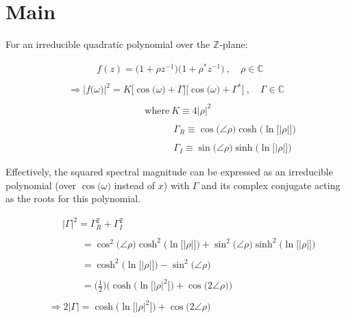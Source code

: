 \documentclass{article}
\begin{document}
\section{Main}

For an irreducible quadratic polynomial over the $\mathbb{Z}$-plane:

\begin{align*}
    &\quad \quad \quad f(z) = \big(1 + \rho z^{-1}\big)\big(1 + \rho^{*}z^{-1}\big) \ , \quad \rho \in \mathbb{C} \\ \\
    &\Rightarrow \Big|f\big(\omega\big)\Big|^{2} = K\Big[\cos\big(\omega\big) + \Gamma\Big]\Big[\cos\big(\omega\big) + \Gamma^{*}\Big] \ , \quad \Gamma \in \mathbb{C} \\ \\ 
    & \quad \quad \quad \quad \quad \quad \quad \quad \text{where} \ K \equiv 4\big|\rho\big|^{2} \\ \\
    & \quad \quad \quad \quad \quad \quad \quad \quad \quad \quad \quad \Gamma_{R} \equiv \cos\big(\angle{\rho}\big)\cosh\Big(\ln\big[\big|\rho\big|\big]\Big) \\ \\  
    & \quad \quad \quad \quad \quad \quad \quad \quad \quad \quad \quad \Gamma_{I} \equiv \sin\big(\angle{\rho}\big)\sinh\Big(\ln\big[\big|\rho\big|\big]\Big)
  \end{align*}\newline

Effectively, the squared spectral magnitude can be expressed as an irreducible polynomial (over $\cos\big(\omega\big)$ instead of $x$) with $\Gamma$ and its complex conjugate acting as the roots for this polynomial.

\begin{align*}
    &\quad \ \ \big|\Gamma\big|^{2} = \Gamma_{R}^{2} + \Gamma_{I}^{2} \\ \\
    &\quad \quad \quad \ \ = \cos^{2}\big(\angle{\rho}\big)\cosh^{2}\Big(\ln\big[\big|\rho\big|\big]\Big) + \sin^{2}\big(\angle{\rho}\big)\sinh^{2}\Big(\ln\big[\big|\rho\big|\big]\Big) \\ \\
    &\quad \quad \quad \ \ = \cosh^{2}\Big(\ln\big[\big|\rho\big|\big]\Big) - \sin^{2}\big(\angle{\rho}\big) \\ \\
    &\quad \quad \quad \ \ = \bigg(\frac{1}{2}\bigg)\Bigg(\cosh\Big(\ln\big[\big|\rho\big|^{2}\big]\Big) + \cos\big(2\angle{\rho}\big)\Bigg) \\ \\
    &\Rightarrow 2\big|\Gamma\big| = \cosh\Big(\ln\big[\big|\rho\big|^{2}\big]\Big) + \cos\big(2\angle{\rho}\big)
  \end{align*}\newline
\end{document}
